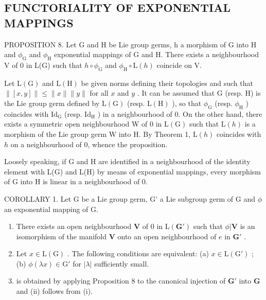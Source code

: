 \subsection{FUNCTORIALITY OF EXPONENTIAL MAPPINGS}

PROPOSITION 8. Let G and H be Lie group germs, h a morphism of G into H and \(\phi_{\mathrm{G}}\) and \(\phi_{\mathrm{H}}\) exponential mappings of G and H. There exists a neighbourhood V of 0 in L(G) such that \(h \circ \phi_{\mathrm{G}}\) and \(\phi_{\mathrm{H}} \circ \mathrm{L}(h)\) coincide on V.

Let \(\mathrm{L}(\mathrm{G})\) and \(\mathrm{L}(\mathrm{H})\) be given norms defining their topologies and such that \(\| [x,y]\| \leqslant \| x\| \| y\|\) for all \(x\) and \(y\) . It can be assumed that \(\mathrm{G}\) (resp. H) is the Lie group germ defined by \(\mathrm{L}(\mathrm{G})\) (resp. \(\mathrm{L}(\mathrm{H})\) ), so that \(\phi_{\mathrm{G}}\) (resp. \(\phi_{\mathrm{H}}\) ) coincides with \(\mathrm{Id}_{\mathrm{G}}\) (resp. \(\mathrm{Id}_{\mathrm{H}}\) ) in a neighbourhood of 0. On the other hand, there exists a symmetric open neighbourhood W of 0 in \(\mathrm{L}(\mathrm{G})\) such that \(\mathrm{L}(h)\) is a morphism of the Lie group germ W into H. By Theorem 1, \(\mathrm{L}(h)\) coincides with \(h\) on a neighbourhood of 0, whence the proposition.

Loosely speaking, if G and H are identified in a neighbourhood of the identity element with L(G) and L(H) by means of exponential mappings, every morphism of G into H is linear in a neighbourhood of 0.

COROLLARY 1. Let G be a Lie group germ, G' a Lie subgroup germ of G and \(\phi\) an exponential mapping of G.

\begin{enumerate}
\def\labelenumi{(\roman{enumi})}
\item
  There exists an open neighbourhood \(\mathbf{V}\) of 0 in \(\mathrm{L}(\mathbf{G}')\) such that \(\phi | \mathbf{V}\) is an isomorphism of the manifold \(\mathbf{V}\) onto an open neighbourhood of \(e\) in \(\mathbf{G}'\) .
\item
  Let \(x \in \mathrm{L}(\mathrm{G})\) . The following conditions are equivalent: (a) \(x \in \mathrm{L}(\mathrm{G}')\) ; (b) \(\phi(\lambda x) \in \mathrm{G}'\) for \(|\lambda|\) sufficiently small.
\item
  is obtained by applying Proposition 8 to the canonical injection of \(\mathbf{G}'\) into \(\mathbf{G}\) and (ii) follows from (i).
\end{enumerate}

